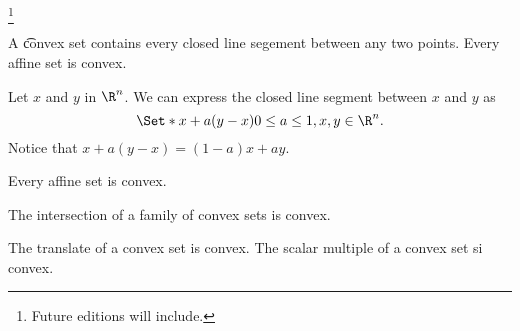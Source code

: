 
  \ifhmode\unskip\fi\footnote{
Future editions will include.
  }


A \t{convex set} contains every closed line segement between any two points.
Every affine set is convex.


Let $x$ and $y$ in $\R ^n$. We can express the closed line segment between $x$ and $y$ as
  \[
\Set*{x + a(y - x)}{0 \leq a \leq 1, x, y \in \R ^n}.
  \]
Notice that $x + a(y - x) = (1-a)x + ay$.

\begin{prop}
Every affine set is convex.
\end{prop}

\begin{prop}
The intersection of a family of convex sets is convex.
\end{prop}

\begin{prop}
The translate of a convex set is convex.
The scalar multiple of a convex set si convex.
\end{prop}

\blankpage

%
%
%
%
%
%
